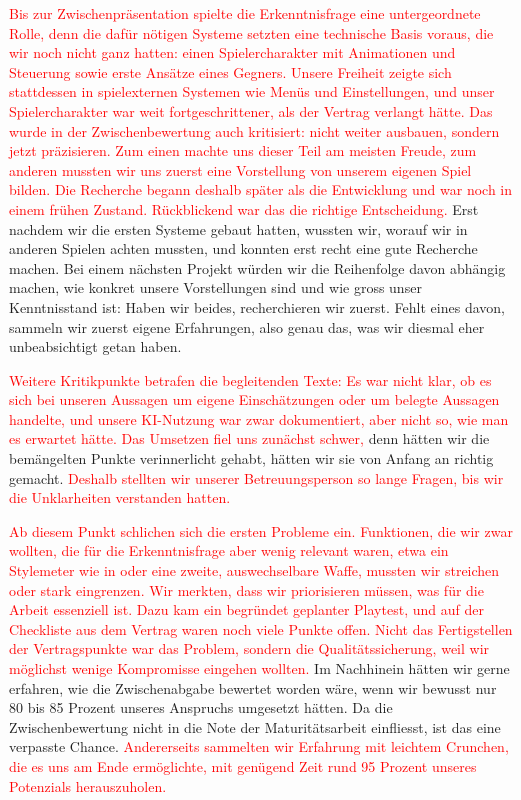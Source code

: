 \documentclass[../Main.tex]{subfiles}
\begin{document}
\textcolor{red}{Bis zur Zwischenpräsentation spielte die Erkenntnisfrage eine untergeordnete Rolle, denn die dafür nötigen Systeme setzten eine technische Basis voraus, die wir noch nicht ganz hatten: einen Spielercharakter mit Animationen und Steuerung sowie erste Ansätze eines Gegners. Unsere Freiheit zeigte sich stattdessen in spielexternen Systemen wie Menüs und Einstellungen, und unser Spielercharakter war weit fortgeschrittener, als der Vertrag verlangt hätte. Das wurde in der Zwischenbewertung auch kritisiert: nicht weiter ausbauen, sondern jetzt präzisieren. Zum einen machte uns dieser Teil am meisten Freude, zum anderen mussten wir uns zuerst eine Vorstellung von unserem eigenen Spiel bilden. Die Recherche begann deshalb später als die Entwicklung und war noch in einem frühen Zustand. Rückblickend war das die richtige Entscheidung.} Erst nachdem wir die ersten Systeme gebaut hatten, wussten wir, worauf wir in anderen Spielen achten mussten, und konnten erst recht eine gute Recherche machen. Bei einem nächsten Projekt würden wir die Reihenfolge davon abhängig machen, wie konkret unsere Vorstellungen sind und wie gross unser Kenntnisstand ist: Haben wir beides, recherchieren wir zuerst. Fehlt eines davon, sammeln wir zuerst eigene Erfahrungen, also genau das, was wir diesmal eher unbeabsichtigt getan haben.

\textcolor{red}{Weitere Kritikpunkte betrafen die begleitenden Texte: Es war nicht klar, ob es sich bei unseren Aussagen um eigene Einschätzungen oder um belegte Aussagen handelte, und unsere KI-Nutzung war zwar dokumentiert, aber nicht so, wie man es erwartet hätte. Das Umsetzen fiel uns zunächst schwer,} denn hätten wir die bemängelten Punkte verinnerlicht gehabt, hätten wir sie von Anfang an richtig gemacht. \textcolor{red}{Deshalb stellten wir unserer Betreuungsperson so lange Fragen, bis wir die Unklarheiten verstanden hatten.}

\textcolor{red}{Ab diesem Punkt schlichen sich die ersten Probleme ein. Funktionen, die wir zwar wollten, die für die Erkenntnisfrage aber wenig relevant waren, etwa ein Stylemeter wie in \autocite{capcom_devilmaycry_2001} oder eine zweite, auswechselbare Waffe, mussten wir streichen oder stark eingrenzen. Wir merkten, dass wir priorisieren müssen, was für die Arbeit essenziell ist. Dazu kam ein begründet geplanter Playtest, und auf der Checkliste aus dem Vertrag waren noch viele Punkte offen. Nicht das Fertigstellen der Vertragspunkte war das Problem, sondern die Qualitätssicherung, weil wir möglichst wenige Kompromisse eingehen wollten.} Im Nachhinein hätten wir gerne erfahren, wie die Zwischenabgabe bewertet worden wäre, wenn wir bewusst nur 80 bis 85 Prozent unseres Anspruchs umgesetzt hätten. Da die Zwischenbewertung nicht in die Note der Maturitätsarbeit einfliesst, ist das eine verpasste Chance. \textcolor{red}{Andererseits sammelten wir Erfahrung mit leichtem Crunchen, die es uns am Ende ermöglichte, mit genügend Zeit rund 95 Prozent unseres Potenzials herauszuholen.}
\end{document}
